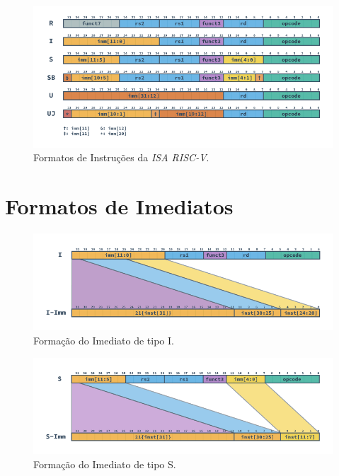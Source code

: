         \begin{figure}[H]
        \centering
            \includegraphics[width=1\linewidth]{figs/RV_Formats.png}
            \caption{Formatos de Instruções da \textit{ISA RISC-V}.}\label{fig:riscv_formats}
        \end{figure}




    \section{Formatos de Imediatos}

        \begin{figure}[H]
        \centering
            \includegraphics[width=1\linewidth]{figs/RV_I_Imm.png}
            \caption{Formação do Imediato de tipo I.}\label{fig:riscv_i_imm}
        \end{figure}

        \begin{figure}[H]
        \centering
            \includegraphics[width=1\linewidth]{figs/RV_S_Imm.png}
            \caption{Formação do Imediato de tipo S.}\label{fig:riscv_s_imm}
        \end{figure}

